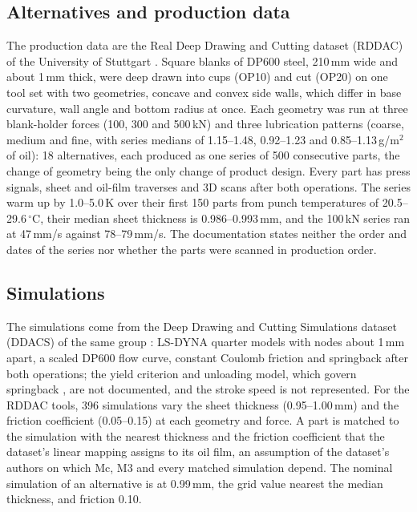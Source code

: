 \documentclass[pdflatex,sn-basic,lineno]{sn-jnl}
\begin{document}
\subsection{Alternatives and production data}\label{sec:data}

The production data are the Real Deep Drawing and Cutting dataset (RDDAC) of the University of Stuttgart \citep{baum2026rddac, baum2026statistical}. Square blanks of DP600 steel, 210\,mm wide and about 1\,mm thick, were deep drawn into cups (OP10) and cut (OP20) on one tool set with two geometries, concave and convex side walls, which differ in base curvature, wall angle and bottom radius at once. Each geometry was run at three blank-holder forces (100, 300 and 500\,kN) and three lubrication patterns (coarse, medium and fine, with series medians of 1.15--1.48, 0.92--1.23 and 0.85--1.13\,g/m$^2$ of oil): 18 alternatives, each produced as one series of 500 consecutive parts, the change of geometry being the only change of product design. Every part has press signals, sheet and oil-film traverses and 3D scans after both operations. The series warm up by 1.0--5.0\,K over their first 150 parts from punch temperatures of 20.5--29.6\,$^\circ$C, their median sheet thickness is 0.986--0.993\,mm, and the 100\,kN series ran at 47\,mm/s against 78--79\,mm/s. The documentation states neither the order and dates of the series nor whether the parts were scanned in production order.

\subsection{Simulations}\label{sec:sims}

The simulations come from the Deep Drawing and Cutting Simulations dataset (DDACS) of the same group \citep{baum2025ddacs, heinzelmann2025comprehensive}: LS-DYNA quarter models with nodes about 1\,mm apart, a scaled DP600 flow curve, constant Coulomb friction and springback after both operations; the yield criterion and unloading model, which govern springback \citep{yoshida2002model}, are not documented, and the stroke speed is not represented. For the RDDAC tools, 396 simulations vary the sheet thickness (0.95--1.00\,mm) and the friction coefficient (0.05--0.15) at each geometry and force. A part is matched to the simulation with the nearest thickness and the friction coefficient that the dataset's linear mapping assigns to its oil film, an assumption of the dataset's authors on which Mc, M3 and every matched simulation depend. The nominal simulation of an alternative is at 0.99\,mm, the grid value nearest the median thickness, and friction 0.10.
\end{document}
